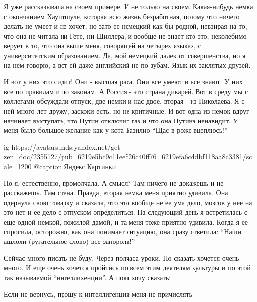 Я уже рассказывала на своем примере. И не только на своем. Какая-нибудь немка с
окончанием Хауптшуле, которая всю жизнь безработная, потому что ничего делать
не умеет и не хочет, но зато ее немецкий как бы родной, невзирая на то, что она
не читала ни Гете, ни Шиллера, и вообще не знает кто это, неколебимо верует в
то, что она выше меня, говорящей на четырех языках, с университетским
образованием. Да, мой немецкий далек от совершенства, но я на нем говорю, а вот
ей даже английский не по зубам. Язык их заклятых друзей.

И вот у них это сидит! Они - высшая раса. Они все умеют и все знают. У них все
по правилам и по законам. А Россия - это страна дикарей. Вот в среду мы с
коллегами обсуждали отпуск, две немки и нас двое, вторая - из Николаева. Я с
ней много лет дружу, заскоки есть, но не критичные. И вот одна из немок вдруг
начинает выступать, что Путин отключит газ и что она Путина ненавидит. У меня
было большое желание как у кота Базилио \enquote{Щас в роже вцеплюсь!} 

\ifcmt
  ig https://avatars.mds.yandex.net/get-zen_doc/2355127/pub_6219e5bc9c11ee526c40ff76_6219efa6cddbf118aa8c3381/scale_1200
	@caption Яндекс.Картинки
\fi

Но я, естественно, промолчала. А смысл? Там ничего не докажешь и не расскажешь.
Там стена. Правда, вторая немка меня приятно удивила. Она одернула свою товарку
и сказала, что это вообще не ее ума дело, мозгов у нее на это нет и ее дело с
отпуском определиться. На следующий день я встретилась с еще одной немкой,
пожилой дамой, и та меня тоже приятно удивила. Когда я ее спросила, осторожно,
как она понимает ситуацию, она сразу ответила: \enquote{Наши ашлохи
(ругательное слово) все запороли!}

Сейчас много писать не буду. Через полчаса уроки. Но сказать хочется очень
много. И еще очень хочется пройтись по всем этим деятелям культуры и по этой
так называемой \enquote{интеллихенции}. А пока хочу сказать:

Если не вернусь, прошу к интеллигенции меня не причислять!
